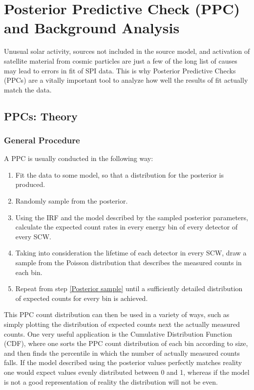 \documentclass{report}
\begin{document}
\section{Posterior Predictive Check (PPC) and Background Analysis} \label{sec:PPC Back}
Unusual solar activity, sources not included in the source model, and activation of satellite material from cosmic particles are just a few of the long list of causes may lead to errors in fit of SPI data. This is why Posterior Predictive Checks (PPCs) are a vitally important tool to analyze how well the results of fit actually match the data.

\subsection{PPCs: Theory}

\subsubsection{General Procedure} \label{PPC general}

A PPC is usually conducted in the following way:

\begin{enumerate}
    \item Fit the data to some model, so that a distribution for the posterior is produced.
    \item \label{Posterior sample} Randomly sample from the posterior.
    \item \label{ppc calc count rates} Using the IRF and the model described by the sampled posterior parameters, calculate the expected count rates in every energy bin of every detector of every SCW.
    \item \label{ppc poisson sample} Taking into consideration the lifetime of each detector in every SCW, draw a sample from the Poisson distribution that describes the measured counts in each bin.
    \item Repeat from step \ref{Posterior sample} until a sufficiently detailed distribution of expected counts for every bin is achieved.
\end{enumerate}

This PPC count distribution can then be used in a variety of ways, such as simply plotting the distribution of expected counts next the actually measured counts. One very useful application is the Cumulative Distribution Function (CDF), where one sorts the PPC count distribution of each bin according to size, and then finds the percentile in which the number of actually measured counts falls. If the model described using the posterior values perfectly matches reality one would expect values evenly distributed between 0 and 1, whereas if the model is not a good representation of reality the distribution will not be even. 
\end{document}
